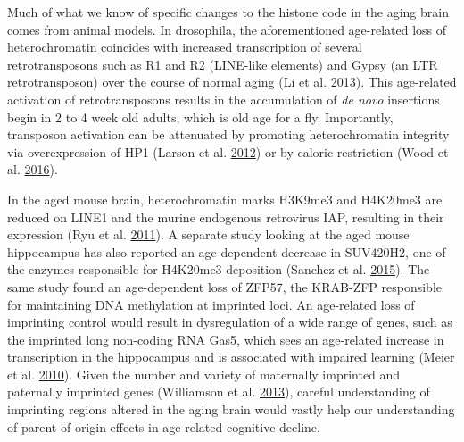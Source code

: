 \documentclass[onehalf,12pt]{beavtex}
\begin{document}
  Much of what we know of specific changes to the histone code in the
  aging brain comes from animal models. In drosophila, the aforementioned
  age-related loss of heterochromatin coincides with increased
  transcription of several retrotransposons such as R1 and R2 (LINE-like
  elements) and Gypsy (an LTR retrotransposon) over the course of normal
  aging (Li et al.
  \protect\hyperlink{ref-LiActivationtransposableelements2013}{2013}).
  This age-related activation of retrotransposons results in the
  accumulation of \emph{de novo} insertions begin in 2 to 4 week old
  adults, which is old age for a fly. Importantly, transposon activation
  can be attenuated by promoting heterochromatin integrity via
  overexpression of HP1 (Larson et al.
  \protect\hyperlink{ref-LarsonHeterochromatinformationpromotes2012}{2012})
  or by caloric restriction (Wood et al.
  \protect\hyperlink{ref-WoodChromatinmodifyinggeneticinterventions2016}{2016}).
  
  In the aged mouse brain, heterochromatin marks H3K9me3 and H4K20me3 are
  reduced on LINE1 and the murine endogenous retrovirus IAP, resulting in
  their expression (Ryu et al.
  \protect\hyperlink{ref-RyuTranscriptionalrepressionrepeatderived2011}{2011}).
  A separate study looking at the aged mouse hippocampus has also reported
  an age-dependent decrease in SUV420H2, one of the enzymes responsible
  for H4K20me3 deposition (Sanchez et al.
  \protect\hyperlink{ref-SanchezAgingApolipoproteinMolecular2015a}{2015}).
  The same study found an age-dependent loss of ZFP57, the KRAB-ZFP
  responsible for maintaining DNA methylation at imprinted loci. An
  age-related loss of imprinting control would result in dysregulation of
  a wide range of genes, such as the imprinted long non-coding RNA Gas5,
  which sees an age-related increase in transcription in the hippocampus
  and is associated with impaired learning (Meier et al.
  \protect\hyperlink{ref-MeierExpressionsnoRNAhost2010}{2010}). Given the
  number and variety of maternally imprinted and paternally imprinted
  genes (Williamson et al.
  \protect\hyperlink{ref-WilliamsonMRCHarwellOxfordshire2013}{2013}),
  careful understanding of imprinting regions altered in the aging brain
  would vastly help our understanding of parent-of-origin effects in
  age-related cognitive decline.
  
\end{document}
